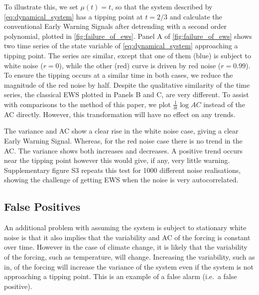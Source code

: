 To illustrate this, we set $\mu(t) = t$, so that the system described by \cref{eq:dynamical_system} has
a tipping point at $t=2/3$ and calculate the conventional Early 
Warning Signals after detrending with a second order polynomial, plotted in \cref{fig:failure_of_ews}.
Panel A of \cref{fig:failure_of_ews} shows two time series of the 
state variable of \cref{eq:dynamical_system} approaching a tipping point.
The series are similar, except that one of them (blue) is subject to white noise ($r = 0$), 
while the other (red) curve is driven by red noise ($r = 0.99$). To
ensure the tipping occurs at a similar time in both
cases, we reduce the magnitude of the red noise by half.
Despite the qualitative similarity of the time series,
the classical EWS plotted in Panels B and C, are very different. To assist with comparisons to the method of this paper, we
plot $\frac{1}{\delta t}\log AC$ instead of the AC directly. However, this
transformation will have no effect on any trends.

The variance and AC show a clear rise in
the white noise case, giving a clear Early Warning Signal. 
Whereas, for the red noise case there is no trend in the AC. The 
variance shows both increases and decreases. A positive trend occurs near
the tipping point however this would give, if any, very little warning. Supplementary figure 
S3 repeats this test for 1000 different noise realisations, showing the
challenge of getting EWS when the noise is very 
autocorrelated.


\subsection{False Positives}
An additional problem with assuming the system is subject to stationary white noise is that it also implies that the
variability and AC of the forcing is constant over time. 
However in the case of 
climate change, it is likely that the variability of the forcing,
such as temperature, will change\cite{Huntingford2013}. 
Increasing the variability, such as in\cite{Boers2021a}, of the forcing will increase the variance of the system even
if the system is not approaching a tipping point. This is an example of a false
alarm (i.e.\ a false positive). 

